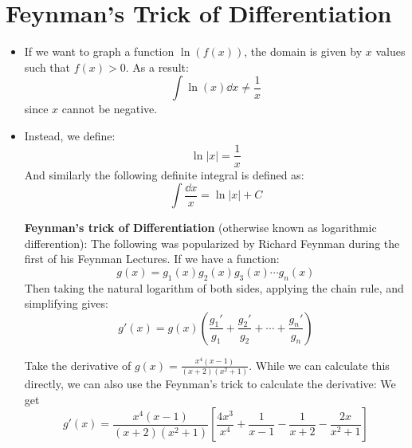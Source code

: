 \section{Feynman's Trick of Differentiation}
\begin{itemize}
    \item If we want to graph a function $\ln(f(x))$, the domain is given by $x$ values such that $f(x)>0$. As a result:
    \begin{equation}
        \int \ln(x) \dd{x} \neq \frac{1}{x}
        \label{eq:}
    \end{equation}
    since $x$ cannot be negative.
    \item Instead, we define:
    \begin{equation}
        \ln|x| = \frac{1}{x}
        \label{eq:}
    \end{equation}
    And similarly the following definite integral is defined as:
    \begin{equation}
        \int \frac{\dd{x}}{x} = \ln|x|+C
        \label{eq:}
    \end{equation}
    \begin{theorem}
        \textbf{Feynman's trick of Differentiation} (otherwise known as logarithmic differention): The following was popularized by Richard Feynman during the first of his Feynman Lectures. If we have a function:
        \begin{equation}
            g(x)=g_1(x)g_2(x)g_3(x)\cdots g_n(x)
            \label{eq:}
        \end{equation}
         Then taking the natural logarithm of both sides, applying the chain rule, and simplifying gives:
         \begin{equation}
             g'(x) = g(x)\left(\frac{g_1'}{g_1}+\frac{g_2'}{g_2}+\cdots+\frac{g_n'}{g_n}\right)
             \label{eq:}
         \end{equation}
    \end{theorem}
    \begin{example}
        Take the derivative of $g(x) = \frac{x^4(x-1)}{(x+2)(x^2+1)}.$ While we can calculate this directly, we can also use the Feynman's trick to calculate the derivative: We get
        \begin{equation}
            g'(x) = \frac{x^4(x-1)}{(x+2)(x^2+1)} \left[\frac{4x^3}{x^4}+\frac{1}{x-1}-\frac{1}{x+2}-\frac{2x}{x^2+1}\right]
        \end{equation}
    \end{example}
\end{itemize}